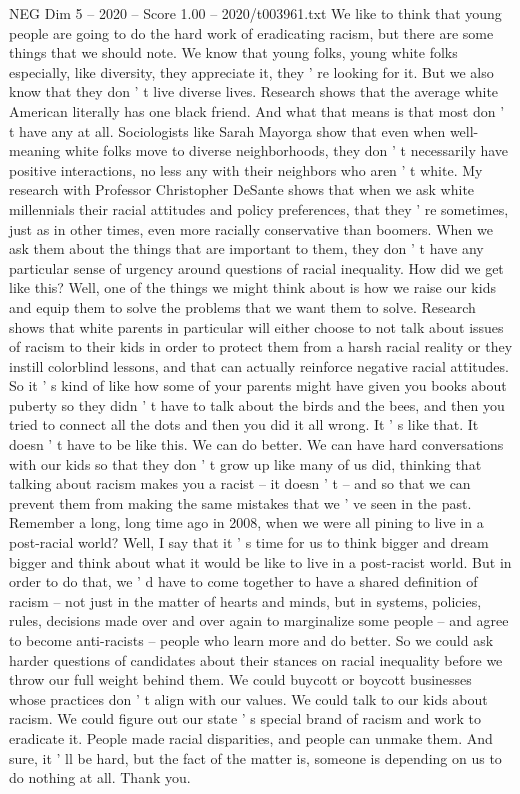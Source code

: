 \begin{textsample}{NEG Dim 5 – 2020 – Score 1.00 – 2020/t003961.txt}
We like to think that young people are going to do the hard work of eradicating racism, but there are some things that we should note.
We know that young folks, young white folks especially, like diversity, they appreciate it, they ' re looking for it.
But we also know that they don ' t live diverse lives.
Research shows that the average white American literally has one black friend.
And what that means is that most don ' t have any at all.
Sociologists like Sarah Mayorga show that even when well-meaning white folks move to diverse neighborhoods, they don ' t necessarily have positive interactions, no less any with their neighbors who aren ' t white.
My research with Professor Christopher DeSante shows that when we ask white millennials their racial attitudes and policy preferences, that they ' re sometimes, just as in other times, even more racially conservative than boomers.
When we ask them about the things that are important to them, they don ' t have any particular sense of urgency around questions of racial inequality.
How did we get like this?
Well, one of the things we might think about is how we raise our kids and equip them to solve the problems that we want them to solve.
Research shows that white parents in particular will either choose to not talk about issues of racism to their kids in order to protect them from a harsh racial reality or they instill colorblind lessons, and that can actually reinforce negative racial attitudes.
So it ' s kind of like how some of your parents might have given you books about puberty so they didn ' t have to talk about the birds and the bees, and then you tried to connect all the dots and then you did it all wrong.
It ' s like that.
It doesn ' t have to be like this.
We can do better.
We can have hard conversations with our kids so that they don ' t grow up like many of us did, thinking that talking about racism makes you a racist -- it doesn ' t -- and so that we can prevent them from making the same mistakes that we ' ve seen in the past.
Remember a long, long time ago in 2008, when we were all pining to live in a post-racial world?
Well, I say that it ' s time for us to think bigger and dream bigger and think about what it would be like to live in a post-racist world.
But in order to do that, we ' d have to come together to have a shared definition of racism -- not just in the matter of hearts and minds, but in systems, policies, rules, decisions made over and over again to marginalize some people -- and agree to become anti-racists -- people who learn more and do better.
So we could ask harder questions of candidates about their stances on racial inequality before we throw our full weight behind them.
We could buycott or boycott businesses whose practices don ' t align with our values.
We could talk to our kids about racism.
We could figure out our state ' s special brand of racism and work to eradicate it.
People made racial disparities, and people can unmake them.
And sure, it ' ll be hard, but the fact of the matter is, someone is depending on us to do nothing at all.
Thank you.

\end{textsample}
